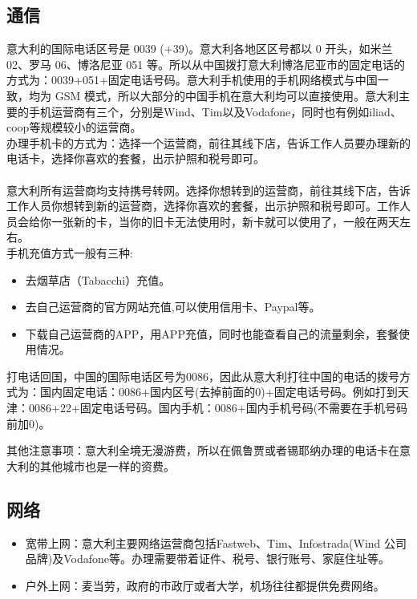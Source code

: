 \subsection{通信}
意大利的国际电话区号是 0039 (+39)。意大利各地区区号都以 0 开头，如米兰 02、罗马 06、博洛尼亚 051 等。所以从中国拨打意大利博洛尼亚市的固定电话的方式为：0039+051+固定电话号码。意大利手机使用的手机网络模式与中国一致，均为 GSM 模式，所以大部分的中国手机在意大利均可以直接使用。意大利主要的手机运营商有三个，分别是Wind、Tim以及Vodafone，同时也有例如iliad、coop等规模较小的运营商。 \\
办理手机卡的方式为：选择一个运营商，前往其线下店，告诉工作人员要办理新的电话卡，选择你喜欢的套餐，出示护照和税号即可。\\
\\
意大利所有运营商均支持携号转网。选择你想转到的运营商，前往其线下店，告诉工作人员你想转到新的运营商，选择你喜欢的套餐，出示护照和税号即可。工作人员会给你一张新的卡，当你的旧卡无法使用时，新卡就可以使用了，一般在两天左右。\\



手机充值方式一般有三种:
\begin{itemize}
\item 去烟草店（Tabacchi）充值。 
\item 去自己运营商的官方网站充值,可以使用信用卡、Paypal等。 
\item 下载自己运营商的APP，用APP充值，同时也能查看自己的流量剩余，套餐使用情况。
\end{itemize}
打电话回国，中国的国际电话区号为0086，因此从意大利打往中国的电话的拨号方式为：国内固定电话：0086+国内区号(去掉前面的0)+固定电话号码。例如打到天津：0086+22+固定电话号码。国内手机：0086+国内手机号码(不需要在手机号码前加0)。

其他注意事项：意大利全境无漫游费，所以在佩鲁贾或者锡耶纳办理的电话卡在意大利的其他城市也是一样的资费。 
\subsection{网络}

\begin{itemize}
\item 宽带上网：意大利主要网络运营商包括Fastweb、Tim、Infostrada(Wind 公司品牌)及Vodafone等。办理需要带着证件、税号、银行账号、家庭住址等。
\item 户外上网：麦当劳，政府的市政厅或者大学，机场往往都提供免费网络。
\end{itemize}
